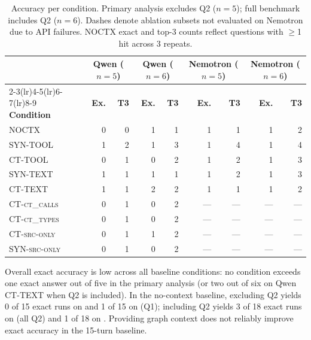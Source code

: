 \begin{table}[h]
\caption{Accuracy per condition. Primary analysis excludes Q2 ($n=5$); full benchmark includes Q2 ($n=6$).
  Dashes denote ablation subsets not evaluated on Nemotron due to API failures.
  NOCTX exact and top-3 counts reflect questions with $\ge$1 hit across 3 repeats.}
\label{tab:accuracy}
\small
\begin{tabular}{lrr|rr|rr|rr}
\toprule
 & \multicolumn{2}{c|}{\textbf{Qwen ($n{=}5$)}}
 & \multicolumn{2}{c|}{\textbf{Qwen ($n{=}6$)}}
 & \multicolumn{2}{c|}{\textbf{Nemotron ($n{=}5$)}}
 & \multicolumn{2}{c}{\textbf{Nemotron ($n{=}6$)}} \\
\cmidrule(lr){2-3}\cmidrule(lr){4-5}\cmidrule(lr){6-7}\cmidrule(lr){8-9}
\textbf{Condition} & \textbf{Ex.} & \textbf{T3}
                   & \textbf{Ex.} & \textbf{T3}
                   & \textbf{Ex.} & \textbf{T3}
                   & \textbf{Ex.} & \textbf{T3} \\
\midrule
\textsc{NOCTX}            & 0 & 0 & 1 & 1 & 1 & 1 & 1 & 2 \\
\textsc{SYN-TOOL}          & 1 & 2 & 1 & 3 & 1 & 4 & 1 & 4 \\
\textsc{CT-TOOL}           & 0 & 1 & 0 & 2 & 1 & 2 & 1 & 3 \\
\textsc{SYN-TEXT}          & 1 & 1 & 1 & 1 & 1 & 2 & 1 & 3 \\
\textsc{CT-TEXT}           & 1 & 1 & 2 & 2 & 1 & 1 & 1 & 2 \\
\midrule
\textsc{CT-ct\_calls}      & 0 & 1 & 0 & 2 & --- & --- & --- & --- \\
\textsc{CT-ct\_types}      & 0 & 1 & 0 & 2 & --- & --- & --- & --- \\
\textsc{CT-src-only}       & 0 & 1 & 1 & 2 & --- & --- & --- & --- \\
\textsc{SYN-src-only}      & 0 & 1 & 0 & 2 & --- & --- & --- & --- \\
\bottomrule
\end{tabular}
\end{table}

Overall exact accuracy is low across all baseline conditions: no condition exceeds one exact
answer out of five in the primary analysis (or two out of six on Qwen \textsc{CT-TEXT} when Q2 is included).
In the no-context baseline, excluding Q2 yields 0 of 15 exact runs on \qwen and 1 of 15 on \nemotron{} (Q1);
including Q2 yields 3 of 18 exact runs on \qwen{} (all Q2) and 1 of 18 on \nemotron.
Providing graph context does not reliably improve exact accuracy in the 15-turn baseline.

